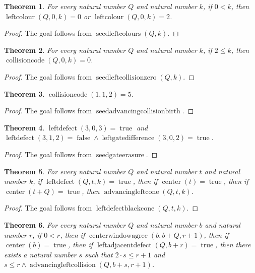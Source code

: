 \documentclass[11pt]{article}
\newtheorem{theorem}{Theorem}[section]
\theoremstyle{definition}
\begin{document}
\begin{theorem}
\label{ll:observations:seed-left-colours}
For every natural number \(Q\) and natural number \(k\), if \(0 < k\), then \(\operatorname{leftcolour}(Q, 0, k) = 0\) or \(\operatorname{leftcolour}(Q, 0, k) = 2\).
\end{theorem}
\begin{proof}
The goal follows from \(\operatorname{seedleftcolours}(Q, k)\).
\end{proof}
\begin{theorem}
\label{ll:observations:seed-left-collision-zero}
For every natural number \(Q\) and natural number \(k\), if \(2 \le k\), then \(\operatorname{collisioncode}(Q, 0, k) = 0\).
\end{theorem}
\begin{proof}
The goal follows from \(\operatorname{seedleftcollisionzero}(Q, k)\).
\end{proof}
\begin{theorem}
\label{ll:observations:seed-advancing-collision-birth}
\(\operatorname{collisioncode}(1, 1, 2) = 5\).
\end{theorem}
\begin{proof}
The goal follows from \(\operatorname{seedadvancingcollisionbirth}\).
\end{proof}
\begin{theorem}
\label{ll:observations:seed-gate-erasure}
\(\operatorname{leftdefect}(3, 0, 3) = \operatorname{true}\) and \(\operatorname{leftdefect}(3, 1, 2) = \operatorname{false} \land \operatorname{leftgatedifference}(3, 0, 2) = \operatorname{true}\).
\end{theorem}
\begin{proof}
The goal follows from \(\operatorname{seedgateerasure}\).
\end{proof}
\begin{theorem}
\label{ll:observations:left-defect-black-cone}
For every natural number \(Q\) and natural number \(t\) and natural number \(k\), if \(\operatorname{leftdefect}(Q, t, k) = \operatorname{true}\), then if \(\operatorname{center}(t) = \operatorname{true}\), then if \(\operatorname{center}(t + Q) = \operatorname{true}\), then \(\operatorname{advancingleftcone}(Q, t, k)\).
\end{theorem}
\begin{proof}
The goal follows from \(\operatorname{leftdefectblackcone}(Q, t, k)\).
\end{proof}
\begin{theorem}
\label{ll:observations:black-window-forces-advancing-collision}
For every natural number \(Q\) and natural number \(b\) and natural number \(r\), if \(0 < r\), then if \(\operatorname{centerwindowagree}(b, b + Q, r + 1)\), then if \(\operatorname{center}(b) = \operatorname{true}\), then if \(\operatorname{leftadjacentdefect}(Q, b + r) = \operatorname{true}\), then there exists a natural number \(s\) such that \(2 \cdot s \le r + 1\) and \(s \le r \land \operatorname{advancingleftcollision}(Q, b + s, r + 1)\).
\end{theorem}
\end{document}
